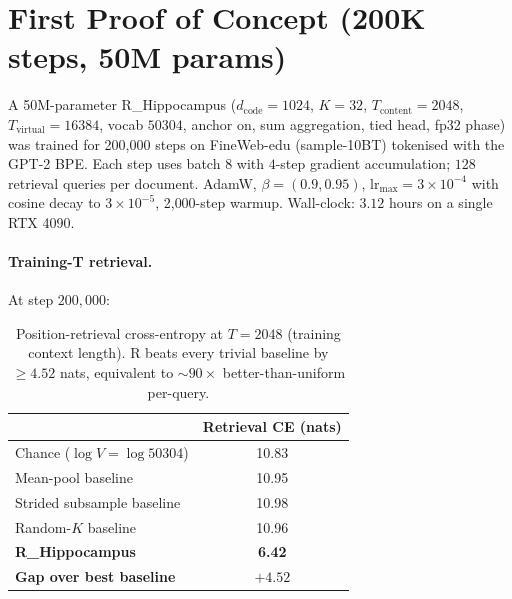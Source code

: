 \documentclass[10pt, twocolumn, a4paper]{article}
\begin{document}
\section{First Proof of Concept (200K steps, 50M params)}
\label{sec:poc}

A 50M-parameter R\_Hippocampus ($d_{\text{code}}=1024$, $K=32$, $T_{\text{content}}=2048$, $T_{\text{virtual}}=16384$, vocab $50304$, anchor on, sum aggregation, tied head, fp32 phase) was trained for 200{,}000 steps on FineWeb-edu (sample-10BT) tokenised with the GPT-2 BPE. Each step uses batch $8$ with $4$-step gradient accumulation; $128$ retrieval queries per document. AdamW, $\beta = (0.9, 0.95)$, $\text{lr}_{\text{max}} = 3 \times 10^{-4}$ with cosine decay to $3 \times 10^{-5}$, 2{,}000-step warmup. Wall-clock: $3.12$ hours on a single RTX 4090.

\paragraph{Training-T retrieval.} At step $200{,}000$:
\begin{table}[h]
\centering\small
\begin{tabular}{@{}lc@{}}
\toprule
& \textbf{Retrieval CE (nats)} \\
\midrule
Chance ($\log V = \log 50304$) & 10.83 \\
Mean-pool baseline & 10.95 \\
Strided subsample baseline & 10.98 \\
Random-$K$ baseline & 10.96 \\
\midrule
\textbf{R\_Hippocampus} & \textbf{6.42} \\
\textbf{Gap over best baseline} & \textbf{$+4.52$} \\
\bottomrule
\end{tabular}
\caption{Position-retrieval cross-entropy at $T=2048$ (training context length). R beats every trivial baseline by $\ge 4.52$ nats, equivalent to $\sim 90\times$ better-than-uniform per-query.}
\label{tab:poc_train_T}
\end{table}
\end{document}

